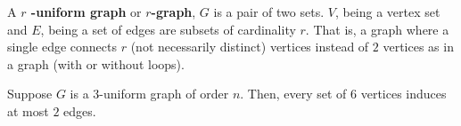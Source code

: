 \begin{definition}[Hypergraphs]
	A \textbf{\(r\) -uniform graph} or \textbf{\(r\)-graph}, \(G\) is a pair of two sets. \(V\), being a vertex set and \(E\), being a set of edges are subsets of cardinality \(r\). That is, a graph where a single edge connects \(r\) (not necessarily distinct) vertices instead of \(2\) vertices as in a graph (with or without loops).
\end{definition}
\begin{proposition}
	Suppose \(G\) is a \(3\)-uniform graph of order \(n\). Then, every set of \(6\) vertices induces at most \(2\) edges.
\end{proposition}
